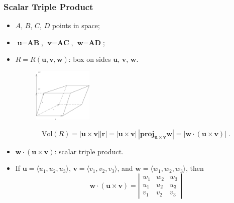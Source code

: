 \begin{frame}[label=current]
  \frametitle{Scalar Triple Product}

\begin{itemize}
 \item $A$, $B$, $C$, $D$ points in space;
  \item $\textbf{u} = \textbf{AB}$, $\textbf{v}=\textbf{AC}$, $\textbf{w}=\textbf{AD}$;
  \item $R=R(\textbf{u},\textbf{v},\textbf{w})$: box on sides $\textbf{u}$, $\textbf{v}$, $\textbf{w}$.\pause
%
\begin{figure}[h]
  \includegraphics[height=1in]{../images/ok-volume_box.eps}
\end{figure}
%
$$\text{Vol}(R) = |\textbf{u} \times \textbf{v}| |\textbf{r}| = |\textbf{u} \times \textbf{v}| \, |\textbf{proj}_{\bm{u} \times \bm{v}} \textbf{w}| =
|\textbf{w} \cdot (\textbf{u} \times \textbf{v})|\; .$$
%
\item $\textbf{w} \cdot (\textbf{u} \times \textbf{v})$: scalar triple product.

\item If $\textbf{u} =\langle u_1,u_2,u_3\rangle$,
$\textbf{v} =\langle v_1,v_2,v_3\rangle$, and $\textbf{w} =\langle w_1,w_2,w_3\rangle$, then
%
$$\textbf{w} \cdot (\textbf{u} \times \textbf{v}) = \left|
\begin{array}{ccc}
w_1 & w_2 & w_3 \\
u_1 & u_2 & u_3 \\
v_1 & v_2 & v_3
\end{array}
 \right|$$
\end{itemize}

\end{frame}

